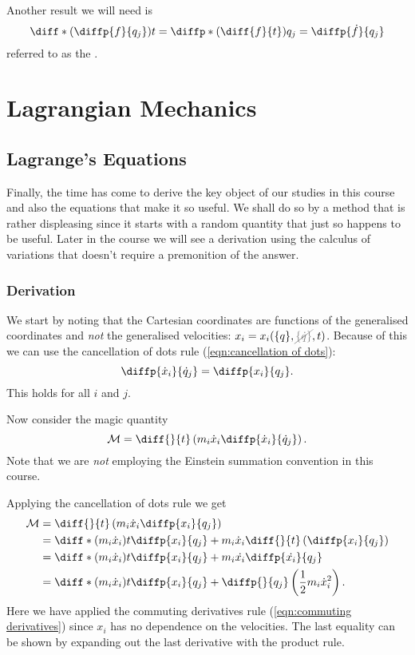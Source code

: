 \documentclass[fleqn]{NotesClass}
\newcommand*{\nodependence}[1]{\textcolor{gray}{\cancel{#1}}}
\begin{document}
    Another result we will need is
    \begin{equation}\label{eqn:commuting derivatives}
        \diff*{\left( \diffp{f}{q_j} \right)}{t} = \diffp*{\left( \diff{f}{t} \right)}{q_j} = \diffp{\dot{f}}{q_j}
    \end{equation}
    referred to as the .
    
    
    \part{Lagrangian Mechanics}
    \chapter{Lagrange's Equations}
    Finally, the time has come to derive the key object of our studies in this course and also the equations that make it so useful.
    We shall do so by a method that is rather displeasing since it starts with a random quantity that just so happens to be useful.
    Later in the course we will see a derivation using the calculus of variations that doesn't require a premonition of the answer.
    
    \section{Derivation}
    We start by noting that the Cartesian coordinates are functions of the generalised coordinates and \emph{not} the generalised velocities: \(x_i = x_i(\{q\}, \nodependence{\{\dot{q}\}}, t)\).
    Because of this we can use the cancellation of dots rule (\cref{eqn:cancellation of dots}):
    \begin{equation}
        \diffp{\dot{x}_i}{\dot{q}_j} = \diffp{x_i}{q_j}.
    \end{equation}
    This holds for all \(i\) and \(j\).
    
    Now consider the magic quantity
    \begin{equation}
        \mathcal{M} = \diff{}{t}\left( m_i\dot{x}_i \diffp{\dot{x}_i}{\dot{q}_j} \right).
    \end{equation}
    Note that we are \emph{not} employing the Einstein summation convention in this course.
    
    Applying the cancellation of dots rule we get
    \begin{align}
        \mathcal{M} &= \diff{}{t} \left( m_i\dot{x}_i \diffp{x_i}{q_j} \right)\\
        &= \diff*{(m_i\dot{x}_i)}{t}\diffp{x_i}{q_j} + m_i\dot{x}_i\diff{}{t}\left( \diffp{x_i}{q_j} \right)\\
        &= \diff*{(m_i\dot{x}_i)}{t}\diffp{x_i}{q_j} + m_i\dot{x_i}\diffp{\dot{x_i}}{q_j}\\
        &= \diff*{(m_i\dot{x}_i)}{t}\diffp{x_i}{q_j} + \diffp{}{q_j}\left( \frac{1}{2}m_i\dot{x}_i^2 \right).
    \end{align}
    Here we have applied the commuting derivatives rule (\cref{eqn:commuting derivatives}) since \(x_i\) has no dependence on the velocities.
    The last equality can be shown by expanding out the last derivative with the product rule.
    
\end{document}
